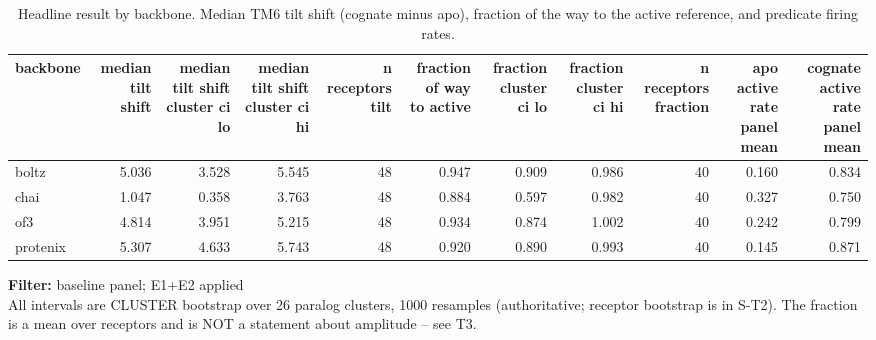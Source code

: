 \begin{table}[htbp]
\centering
\footnotesize
\caption{Headline result by backbone. Median TM6 tilt shift (cognate minus apo), fraction of the way to the active reference, and predicate firing rates.}
\label{tab:t2_headline_by_backbone}
\begin{tabular}{lrrrrrrrrrr}
\toprule
backbone & median tilt shift & median tilt shift cluster ci lo & median tilt shift cluster ci hi & n receptors tilt & fraction of way to active & fraction cluster ci lo & fraction cluster ci hi & n receptors fraction & apo active rate panel mean & cognate active rate panel mean \\
\midrule
boltz & 5.036 & 3.528 & 5.545 & 48 & 0.947 & 0.909 & 0.986 & 40 & 0.160 & 0.834 \\
chai & 1.047 & 0.358 & 3.763 & 48 & 0.884 & 0.597 & 0.982 & 40 & 0.327 & 0.750 \\
of3 & 4.814 & 3.951 & 5.215 & 48 & 0.934 & 0.874 & 1.002 & 40 & 0.242 & 0.799 \\
protenix & 5.307 & 4.633 & 5.743 & 48 & 0.920 & 0.890 & 0.993 & 40 & 0.145 & 0.871 \\
\bottomrule
\end{tabular}
\begin{flushleft}\scriptsize
\textbf{Filter:} baseline panel; E1+E2 applied
 \\ All intervals are CLUSTER bootstrap over 26 paralog clusters, 1000 resamples (authoritative; receptor bootstrap is in S-T2). The fraction is a mean over receptors and is NOT a statement about amplitude -- see T3.
\end{flushleft}
\end{table}
